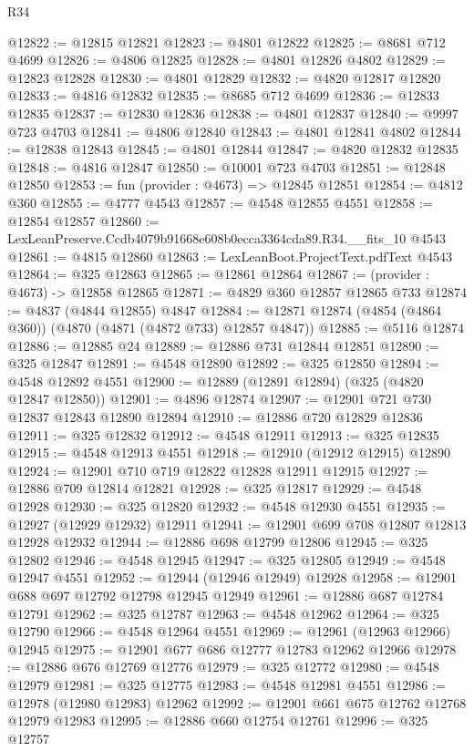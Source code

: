 \begin{lexlean}{R34}
\begin{coremodule}
@12822 := @12815 @12821
@12823 := @4801 @12822
@12825 := @8681 @712 @4699
@12826 := @4806 @12825
@12828 := @4801 @12826 @4802
@12829 := @12823 @12828
@12830 := @4801 @12829
@12832 := @4820 @12817 @12820
@12833 := @4816 @12832
@12835 := @8685 @712 @4699
@12836 := @12833 @12835
@12837 := @12830 @12836
@12838 := @4801 @12837
@12840 := @9997 @723 @4703
@12841 := @4806 @12840
@12843 := @4801 @12841 @4802
@12844 := @12838 @12843
@12845 := @4801 @12844
@12847 := @4820 @12832 @12835
@12848 := @4816 @12847
@12850 := @10001 @723 @4703
@12851 := @12848 @12850
@12853 := fun (provider : @4673) => @12845 @12851
@12854 := @4812 @360
@12855 := @4777 @4543
@12857 := @4548 @12855 @4551
@12858 := @12854 @12857
@12860 := LexLeanPreserve.Ccdb4079b91668e608b0ecca3364cda89.R34.__fits_10 @4543
@12861 := @4815 @12860
@12863 := LexLeanBoot.ProjectText.pdfText @4543
@12864 := @325 @12863
@12865 := @12861 @12864
@12867 := (provider : @4673) -> @12858 @12865
@12871 := @4829 @360 @12857 @12865 @733
@12874 := @4837 (@4844 @12855) @4847
@12884 := @12871 @12874 (@4854 (@4864 @360)) (@4870 (@4871 (@4872 @733) @12857 @4847))
@12885 := @5116 @12874
@12886 := @12885 @24
@12889 := @12886 @731 @12844 @12851
@12890 := @325 @12847
@12891 := @4548 @12890
@12892 := @325 @12850
@12894 := @4548 @12892 @4551
@12900 := @12889 (@12891 @12894) (@325 (@4820 @12847 @12850))
@12901 := @4896 @12874
@12907 := @12901 @721 @730 @12837 @12843 @12890 @12894
@12910 := @12886 @720 @12829 @12836
@12911 := @325 @12832
@12912 := @4548 @12911
@12913 := @325 @12835
@12915 := @4548 @12913 @4551
@12918 := @12910 (@12912 @12915) @12890
@12924 := @12901 @710 @719 @12822 @12828 @12911 @12915
@12927 := @12886 @709 @12814 @12821
@12928 := @325 @12817
@12929 := @4548 @12928
@12930 := @325 @12820
@12932 := @4548 @12930 @4551
@12935 := @12927 (@12929 @12932) @12911
@12941 := @12901 @699 @708 @12807 @12813 @12928 @12932
@12944 := @12886 @698 @12799 @12806
@12945 := @325 @12802
@12946 := @4548 @12945
@12947 := @325 @12805
@12949 := @4548 @12947 @4551
@12952 := @12944 (@12946 @12949) @12928
@12958 := @12901 @688 @697 @12792 @12798 @12945 @12949
@12961 := @12886 @687 @12784 @12791
@12962 := @325 @12787
@12963 := @4548 @12962
@12964 := @325 @12790
@12966 := @4548 @12964 @4551
@12969 := @12961 (@12963 @12966) @12945
@12975 := @12901 @677 @686 @12777 @12783 @12962 @12966
@12978 := @12886 @676 @12769 @12776
@12979 := @325 @12772
@12980 := @4548 @12979
@12981 := @325 @12775
@12983 := @4548 @12981 @4551
@12986 := @12978 (@12980 @12983) @12962
@12992 := @12901 @661 @675 @12762 @12768 @12979 @12983
@12995 := @12886 @660 @12754 @12761
@12996 := @325 @12757

\end{coremodule}
\end{lexlean}
